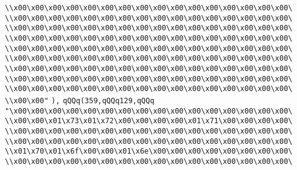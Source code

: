 \verb|\\x00\x00\x00\x00\x00\x00\x00\x00\x00\x00\x00\x00\x00\x00\x00\x00\|\newline
\verb|\\x00\x00\x00\x00\x00\x00\x00\x00\x00\x00\x00\x00\x00\x00\x00\x00\|\newline
\verb|\\x00\x00\x00\x00\x00\x00\x00\x00\x00\x00\x00\x00\x00\x00\x00\x00\|\newline
\verb|\\x00\x00\x00\x00\x00\x00\x00\x00\x00\x00\x00\x00\x00\x00\x00\x00\|\newline
\verb|\\x00\x00\x00\x00\x00\x00\x00\x00\x00\x00\x00\x00\x00\x00\x00\x00\|\newline
\verb|\\x00\x00\x00\x00\x00\x00\x00\x00\x00\x00\x00\x00\x00\x00\x00\x00\|\newline
\verb|\\x00\x00\x00\x00\x00\x00\x00\x00\x00\x00\x00\x00\x00\x00\x00\x00\|\newline
\verb|\\x00\x00\x00\x00\x00\x00\x00\x00\x00\x00\x00\x00\x00\x00\x00\x00\|\newline
\verb|\\x00\x00\x00\x00\x00\x00\x00\x00\x00\x00\x00\x00\x00\x00\x00\x00\|\newline
\verb|\\x00\x00"|\newline
\verb|),|\newline
\verb|qQQq(359,qQQq129,qQQq|\newline
\verb|"\x00\x00\x00\x00\x00\x00\x00\x00\x00\x00\x00\x00\x00\x00\x00\x00\|\newline
\verb|\\x00\x00\x01\x73\x01\x72\x00\x00\x00\x00\x01\x71\x00\x00\x00\x00\|\newline
\verb|\\x00\x00\x00\x00\x00\x00\x00\x00\x00\x00\x00\x00\x00\x00\x00\x00\|\newline
\verb|\\x00\x00\x00\x00\x00\x00\x00\x00\x00\x00\x00\x00\x00\x00\x00\x00\|\newline
\verb|\\x01\x70\x01\x6f\x00\x00\x01\x6e\x00\x00\x00\x00\x00\x00\x00\x00\|\newline
\verb|\\x00\x00\x00\x00\x00\x00\x00\x00\x00\x00\x00\x00\x00\x00\x00\x00\|\newline
